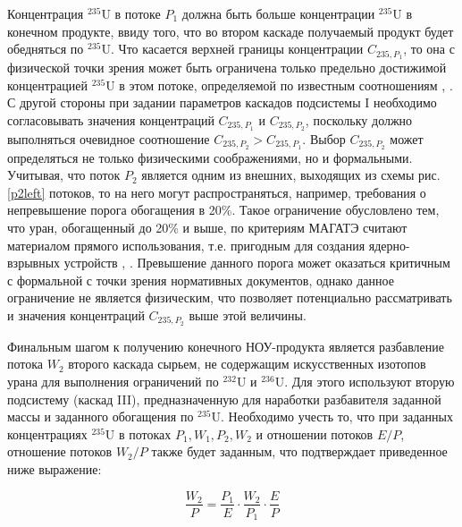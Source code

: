 Концентрация $^{235}$U в потоке $P_1$ должна быть больше концентрации $^{235}$U в конечном продукте, ввиду того, что во втором каскаде получаемый продукт будет обедняться по $^{235}$U. Что касается верхней границы концентрации ${C}_{235,{P_1}}$, то она с физической точки зрения может быть ограничена только предельно достижимой концентрацией $^{235}$U в этом потоке, определяемой по известным соотношениям \cite{sulaberidzeOsobennostiObogashcheniyaKomponentov2006}, \cite{minenkoPredelnoeObogashcheniePromezhutochnyh1972}. С другой стороны при задании параметров каскадов подсистемы I необходимо согласовывать значения концентраций ${C}_{235,{P_1}}$ и ${C}_{235,{P_2}}$, поскольку должно выполняться очевидное соотношение ${C}_{235,{P_2}}{>}{C}_{235,{P_1}}$.
Выбор $C_{235,{P_2}}$ может определяться не только физическими соображениями, но и формальными. Учитывая, что поток $P_2$ является одним из внешних, выходящих из схемы рис. \ref{p2left} потоков, то на него могут распространяться, например, требования о непревышение порога обогащения в 20\%. Такое ограничение обусловлено тем, что уран, обогащенный до 20\% и выше, по критериям МАГАТЭ считают материалом прямого использования, т.е. пригодным для создания ядерно-взрывных устройств \cite{brownOriginsSignificanceLimit2016}, \cite{pshakinYadernoeNerasprostranenie2006}. Превышение данного порога может оказаться критичным с формальной с точки зрения нормативных документов, однако данное ограничение не является физическим, что позволяет потенциально рассматривать и значения концентраций  $C_{235,{P_2}}$ выше этой величины. 

Финальным шагом к получению конечного НОУ-продукта является разбавление потока $W_2$ второго каскада сырьем, не содержащим искусственных изотопов урана для выполнения ограничений по $^{232}$U и $^{236}$U.
Для этого используют вторую подсистему (каскад III), предназначенную для наработки разбавителя заданной массы и заданного обогащения по $^{235}$U.
Необходимо учесть то, что при заданных концентрациях $^{235}$U в потоках ${P_1}, {W_1}, {P_2}, {W_2}$ и отношении потоков $E/P$, отношение потоков ${W_2}{/P}$ также будет заданным, что подтверждает приведенное ниже выражение:

\begin{equation}
    \label{dc1}
    \frac{W_{2}}{P}=\frac{P_{1}}{E}\cdot\frac{W_{2}}{P_{1}}\cdot\frac{E}{P}
  \end{equation}


